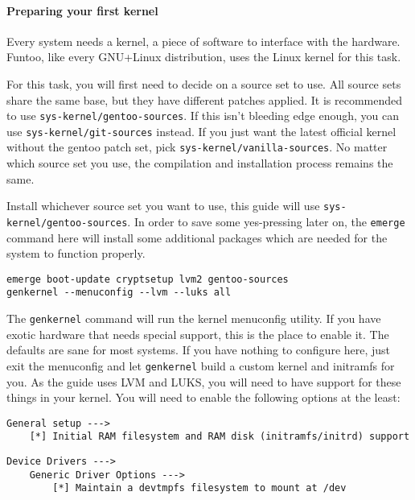 \paragraph{Preparing your first
kernel}\label{preparing-your-first-kernel}

Every system needs a kernel, a piece of software to interface with the
hardware. Funtoo, like every GNU+Linux distribution, uses the Linux
kernel for this task.

For this task, you will first need to decide on a source set to use. All
source sets share the same base, but they have different patches
applied. It is recommended to use \texttt{sys-kernel/gentoo-sources}. If
this isn't bleeding edge enough, you can use
\texttt{sys-kernel/git-sources} instead. If you just want the latest
official kernel without the gentoo patch set, pick
\texttt{sys-kernel/vanilla-sources}. No matter which source set you use,
the compilation and installation process remains the same.

Install whichever source set you want to use, this guide will use
\texttt{sys-kernel/gentoo-sources}. In order to save some yes-pressing
later on, the \texttt{emerge} command here will install some additional
packages which are needed for the system to function properly.

\begin{verbatim}
emerge boot-update cryptsetup lvm2 gentoo-sources
genkernel --menuconfig --lvm --luks all
\end{verbatim}

The \texttt{genkernel} command will run the kernel menuconfig utility.
If you have exotic hardware that needs special support, this is the
place to enable it. The defaults are sane for most systems. If you have
nothing to configure here, just exit the menuconfig and let
\texttt{genkernel} build a custom kernel and initramfs for you. As the
guide uses LVM and LUKS, you will need to have support for these things
in your kernel. You will need to enable the following options at the
least:

\begin{verbatim}
General setup --->
    [*] Initial RAM filesystem and RAM disk (initramfs/initrd) support
\end{verbatim}

\begin{verbatim}
Device Drivers --->
    Generic Driver Options --->
        [*] Maintain a devtmpfs filesystem to mount at /dev
\end{verbatim}

